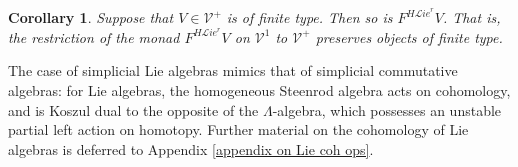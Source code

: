 \documentclass[11pt]{amsart} \renewcommand{\baselinestretch}{1.2}
\theoremstyle{plain}
\newtheorem{cor}[thm]{Corollary}
\numberwithin{equation}{section} %
\theoremstyle{plain}
\newtheorem{cor}[thm]{Corollary}
\numberwithin{equation}{chapter} %
\newcommand{\scrL}{\mathscr{L}}
\newcommand{\calV}{\mathcal{V}}
\newcommand{\vect}[2]{\calV^{#1}_{#2}}
\newcommand{\HA}[1]{H#1}
\newcommand{\liealgs}{{\scrL\!\textit{ie}}}
\newcommand{\restliealgs}{{\scrL\!\textit{ie}^\textit{r}}}
\begin{document}
\begin{Constructing cohomology operations}
\begin{cor}
\label{finite type pres by F lierest halg}
Suppose that $V\in\vect{+}{}$ is of finite type. Then so is $F^{\HA{\restliealgs}}V$. That is, the restriction of the monad $F^{\HA{\restliealgs}}V$ on $\vect{1}{}$ to $\vect{+}{}$ preserves objects of finite type.
\end{cor}

The case of simplicial Lie algebras mimics that of simplicial commutative algebras: for Lie algebras, the homogeneous Steenrod algebra acts on cohomology, and is Koszul dual to the opposite of the $\Lambda$-algebra, which possesses an unstable partial left action on  homotopy.
Further material on the cohomology of Lie algebras is deferred to Appendix \ref{appendix on Lie coh ops}.

\end{Constructing cohomology operations}
\end{document}
